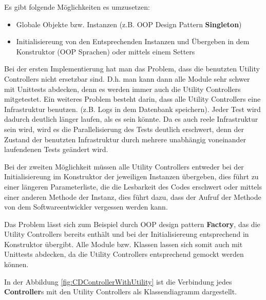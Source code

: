 \documentclass{article}
\begin{document}
    Es gibt folgende Möglichkeiten es umzusetzen:
    \begin{itemize}
        \item Globale Objekte bzw. Instanzen (z.B. OOP Design Pattern \textbf{Singleton})
        \item Initialisiereung von den Entsprechenden Instanzen und Übergeben in dem Konstruktor (OOP Sprachen)
        oder mittels einem Setters
    \end{itemize}

    Bei der ersten Implementierung hat man das Problem, dass die benutzten Utility Controllers nicht ersetzbar sind.
    D.h. man kann dann alle Module sehr schwer mit Unittests abdecken, denn es werden immer auch die Utility Controllers mitgetestet.
    Ein weiteres Problem besteht darin, dass alle Utility Controllers eine Infrastruktur benutzen.
    (z.B. Logs in dem Datenbank speichern). Jeder Test wird dadurch deutlich länger laufen, als es sein könnte.
    Da es auch reele Infrastruktur sein wird, wird es die Parallelisierung des Tests deutlich erschwert, denn 
    der Zustand der benutzten Infrastruktur durch mehrere unabhängig voneinander laufendenen Tests geändert wird.

    Bei der zweiten Möglichkeit müssen alle Utility Controllers entweder bei der Initialisiereung im Konstruktor 
    der jeweiligen Instanzen übergeben, dies führt zu einer längeren Parameterliste,
    die die Lesbarkeit des Codes erschwert oder mittels einer anderen Methode der Instanz,
    dies führt dazu, dass der Aufruf der Methode von dem Softwareentwickler vergessen werden kann.
    
    Das Problem lässt sich zum Beispiel durch OOP design pattern \textbf{Factory}, das die Utility Controllers bereits
    enthält und bei der Initialisiereung entsprechend in Konstruktor übergibt. Alle Module bzw. Klassen lassen sich somit auch mit Unittests
    abdecken, da die Utility Controllers entsprechend gemockt werden können. 

    In der Abbildung \ref{fig:CDControllerWithUtility} ist die Verbindung jedes \textbf{Controller}s mit den Utility Controllers als Klassendiagramm dargestellt.
        
\end{document}
